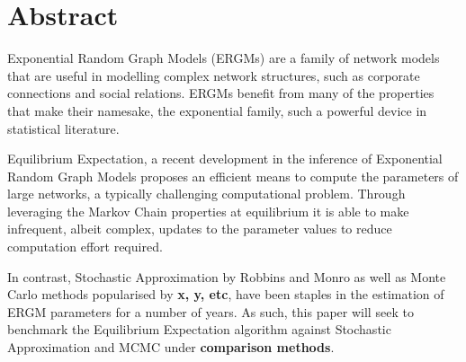 \section{Abstract}

Exponential Random Graph Models (ERGMs) are a family of network models that are useful in modelling complex network structures, such as corporate connections and social relations. ERGMs benefit from many of the properties that make their namesake, the exponential family, such a powerful device in statistical literature. 

Equilibrium Expectation, a recent development in the inference of Exponential Random Graph Models proposes an efficient means to compute the parameters of large networks, a typically challenging computational problem. Through leveraging the Markov Chain properties at equilibrium it is able to make infrequent, albeit complex, updates to the parameter values to reduce computation effort required.

In contrast, Stochastic Approximation by Robbins and Monro as well as Monte Carlo methods popularised by \textbf{x, y, etc}, have been staples in the estimation of ERGM parameters for a number of years. As such, this paper will seek to benchmark the Equilibrium Expectation algorithm against Stochastic Approximation and MCMC under \textbf{comparison methods}.
